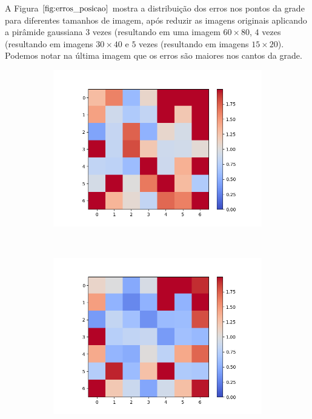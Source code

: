 A Figura $\ref{fig:erros_posicao}$ mostra a distribuição dos erros nos pontos da grade para diferentes tamanhos de imagem, após reduzir as imagens originais aplicando a pirâmide gaussiana $3$ vezes (resultando em uma imagem $60 \times 80$, $4$ vezes (resultando em imagens $30 \times 40$ e $5$ vezes (resultando em imagens $15 \times 20$). Podemos notar na última imagem que os erros são maiores nos cantos da grade.

\begin{figure}
\centering
	\begin{subfigure}[b]{0.4\textwidth}
        \centering
        \includegraphics[scale=.4]{imagens/erros5pyrDown.png}
        \caption{}
    \end{subfigure}
    ~
    \begin{subfigure}[b]{0.4\textwidth}
        \centering
        \includegraphics[scale=.4]{imagens/erros4pyrDown.png}
        \caption{}
    \end{subfigure}\\
    

\end{figure}
